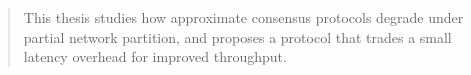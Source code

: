 \begin{abstract}
This thesis studies how approximate consensus protocols degrade under
partial network partition, and proposes a protocol that trades a small
latency overhead for improved throughput.
\end{abstract}
